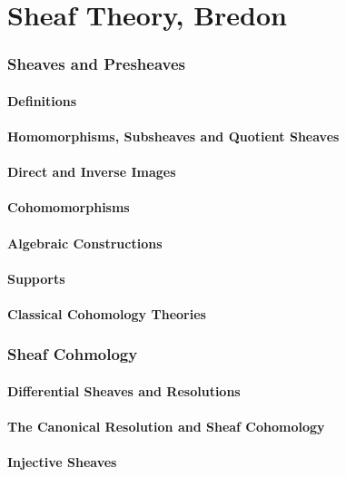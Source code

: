 \part{Sheaf Theory, Bredon}

\section{Sheaves and Presheaves}
\subsection{Definitions}
\subsection{Homomorphisms, Subsheaves and Quotient Sheaves}
\subsection{Direct and Inverse Images}
\subsection{Cohomomorphisms}
\subsection{Algebraic Constructions}
\subsection{Supports}
\subsection{Classical Cohomology Theories}

\section{Sheaf Cohmology}
\subsection{Differential Sheaves and Resolutions}
\subsection{The Canonical Resolution and Sheaf Cohomology}
\subsection{Injective Sheaves}
